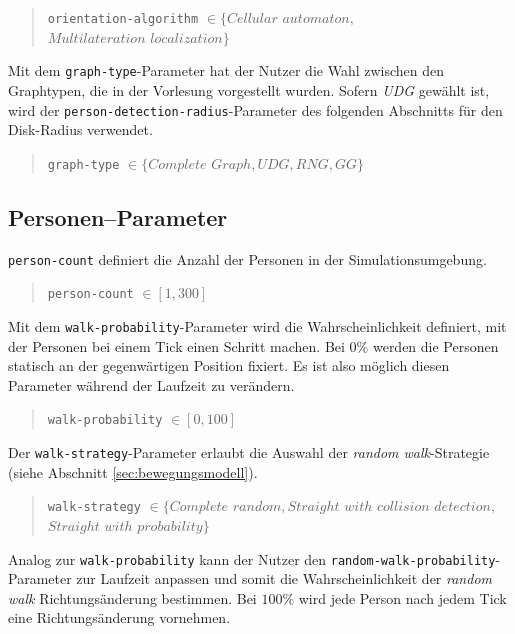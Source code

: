 \begin{quote}
\verb|orientation-algorithm| $\in \{Cellular$ $automaton,$\\\hspace*{4.9cm}$Multilateration$ $localization\}$
\end{quote}

Mit dem \verb|graph-type|-Parameter hat der Nutzer die Wahl zwischen den Graphtypen, die in der Vorlesung vorgestellt wurden. Sofern \emph{UDG} gewählt ist, wird der \verb|person-detection-radius|-Parameter des folgenden Abschnitts für den Disk-Radius verwendet.

\begin{quote}
\verb|graph-type| $\in \{Complete$ $Graph, UDG, RNG, GG\}$
\end{quote}

\subsection{Personen--Parameter}
\label{sec:gui_person}

\verb|person-count| definiert die Anzahl der Personen in der Simulationsumgebung.

\begin{quote}
\verb|person-count| $\in [1, 300]$
\end{quote}

Mit dem \verb|walk-probability|-Parameter wird die Wahrscheinlichkeit definiert, mit der Personen bei einem Tick einen Schritt machen. Bei $0 \%$ werden die Personen statisch an der gegenwärtigen Position fixiert. Es ist also möglich diesen Parameter während der Laufzeit zu verändern.  

\begin{quote}
\verb|walk-probability| $\in [0, 100]$
\end{quote}

Der \verb|walk-strategy|-Parameter erlaubt die Auswahl der \emph{random walk}-Strategie (siehe Abschnitt \ref{sec:bewegungsmodell}).

\begin{quote}
\verb|walk-strategy| $\in \{Complete$ $random, Straight$ $with$ $collision$ $detection,$\\\hspace*{3.2cm}$Straight$ $with$ $probability\}$
\end{quote}

Analog zur \verb|walk-probability| kann der Nutzer den \verb|random-walk-probability|-Parameter zur Laufzeit anpassen und somit die Wahrscheinlichkeit der \emph{random walk} Richtungsänderung bestimmen. Bei $100 \%$ wird jede Person nach jedem Tick eine Richtungsänderung vornehmen.

